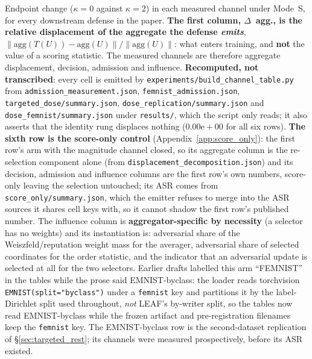 \documentclass{article}
\begin{document}
\noindent Endpoint change ($\kappa{=}0$ against $\kappa{=}2$) in each measured channel under Mode~S, for every downstream defense in the paper. \textbf{The first column, $\Delta$~agg., is the relative displacement of the aggregate the defense \emph{emits}}, $\|\mathrm{agg}(T(U)) - \mathrm{agg}(U)\|/\|\mathrm{agg}(U)\|$: what enters training, and \textbf{not} the value of a scoring statistic. The measured channels are therefore aggregate displacement, decision, admission and influence. \textbf{Recomputed, not transcribed}: every cell is emitted by \texttt{experiments/build\_channel\_table.py} from \texttt{admission\_\allowbreak measurement.json}, \texttt{femnist\_admission.json}, \texttt{targeted\_dose/summary.json}, \texttt{dose\_\allowbreak replication/summary.json} and \texttt{dose\_femnist/summary.json} under \texttt{results/}, which the script only reads; it also asserts that the identity rung displaces nothing ($0.00\mathrm{e}{+}00$ for all six rows). \textbf{The sixth row is the score-only control} (Appendix~\ref{app:score_only}): the first row's arm with the magnitude channel closed, so its aggregate column is the re-selection component alone (from \texttt{displacement\_decomposition.json}) and its decision, admission and influence columns are the first row's own numbers, score-only leaving the selection untouched; its ASR comes from \texttt{score\_only/summary.json}, which the emitter refuses to merge into the ASR sources it shares cell keys with, so it cannot shadow the first row's published number. The influence column is \textbf{aggregator-specific by necessity} (a selector has no weights) and its instantiation is: adversarial share of the Weiszfeld/reputation weight mass for the averager, adversarial share of selected coordinates for the order statistic, and the indicator that an adversarial update is selected at all for the two selectors. Earlier drafts labelled this arm ``FEMNIST'' in the tables while the prose said EMNIST-byclass: the loader reads torchvision \texttt{EMNIST(split="byclass")} under a \texttt{femnist} key and partitions it by the label-Dirichlet split used throughout, \emph{not} LEAF's by-writer split, so the tables now read EMNIST-byclass while the frozen artifact and pre-registration filenames keep the \texttt{femnist} key. The EMNIST-byclass row is the second-dataset replication of \S\ref{sec:targeted_rest}; its channels were measured prospectively, before its ASR existed.
\end{document}

